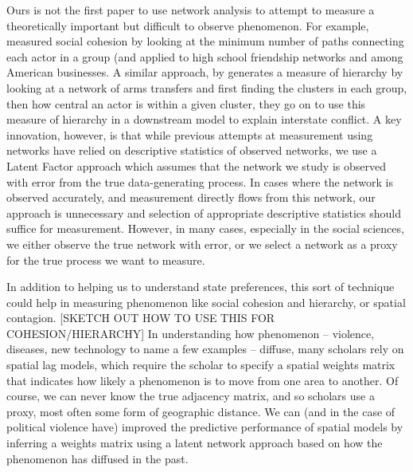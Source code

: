 Ours is not the first paper to use network analysis to attempt to measure a theoretically important but difficult to observe phenomenon. For example, \citet{moody:white:2003} measured social cohesion by looking at the minimum number of paths connecting each actor in a group (and applied to high school friendship networks and among American businesses. A similar approach, by \citet{beardsley:etal:2019} generates a measure of hierarchy by looking at a network of arms transfers and first finding the clusters in each group,  then how central an actor is within a given cluster, they go on to use this measure of hierarchy in a downstream model to explain interstate conflict. A key innovation, however, is that while previous attempts at measurement using networks have relied on descriptive statistics of observed networks, we use a Latent Factor approach which assumes that the network we study is observed with error from the true data-generating process. In cases where the network is observed accurately, and measurement directly flows from this network, our approach is unnecessary and selection of appropriate descriptive statistics should suffice for measurement. However, in many cases, especially in the social sciences, we either observe the true network with error, or we select a network as a proxy for the true process we want to measure. 

In addition to helping us to understand state preferences, this sort of technique could help in measuring phenomenon like social cohesion and hierarchy, or spatial contagion. [SKETCH OUT HOW TO USE THIS FOR COHESION/HIERARCHY] In understanding how phenomenon -- violence, diseases, new technology to name a few examples -- diffuse, many scholars rely on spatial lag models, which require the scholar to specify a spatial weights matrix that indicates how likely a phenomenon is to move from one area to another. Of course, we can never know the true adjacency matrix, and so scholars use a proxy, most often some form of geographic distance. We can (and in the case of political violence have) improved the predictive performance of spatial models by inferring a weights matrix using a latent network approach based on how the phenomenon has diffused in the past. 

